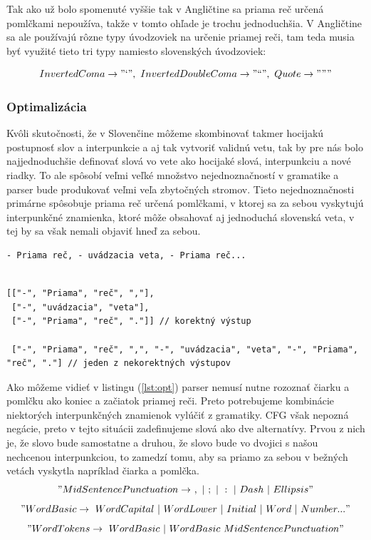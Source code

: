 \documentclass[12pt,a4paper]{report}
\theoremstyle{definition}
\theoremstyle{remark}
\begin{document}
Tak ako už bolo spomenuté vyššie tak v Angličtine sa priama reč určená pomlčkami nepoužíva, takže v tomto ohľade je trochu jednoduchšia. V Angličtine sa ale používajú rôzne typy úvodzoviek na určenie priamej reči, tam teda musia byť využité tieto tri typy namiesto slovenských úvodzoviek:

$$InvertedComa \to "\text{`}", \ InvertedDoubleComa \to"\text{``}", \  Quote \to """$$

\subsubsection{Optimalizácia}
Kvôli skutočnosti, že v Slovenčine môžeme skombinovať takmer hocijakú postupnosť slov a interpunkcie a aj tak vytvoriť validnú vetu, tak by pre nás bolo najjednoduchšie definovať slová vo vete ako hocijaké slová, interpunkciu a nové riadky. To ale spôsobí veľmi veľké množstvo nejednoznačností v gramatike a parser bude produkovať veľmi veľa zbytočných stromov. Tieto nejednoznačnosti primárne spôsobuje priama reč určená pomlčkami, v ktorej sa za sebou vyskytujú interpunkčné znamienka, ktoré môže obsahovať aj jednoduchá slovenská veta, v tej by sa však nemali objaviť hneď za sebou.
\begin{lstlisting}[caption={Nejednoznačný vstup},style=htmlcssjs]
- Priama reč, - uvádzacia veta, - Priama reč...
\end{lstlisting}
\begin{lstlisting}[caption={Výstupné vety vo forme polí},style=htmlcssjs, label={lst:opt}]

[["-", "Priama", "reč", ","],
 ["-", "uvádzacia", "veta"],
 ["-", "Priama", "reč", "."]] // korektný výstup
 
 ["-", "Priama", "reč", ",", "-", "uvádzacia", "veta", "-", "Priama", "reč", "."] // jeden z nekorektných výstupov
\end{lstlisting}
Ako môžeme vidieť v listingu (\ref{lst:opt}) parser nemusí nutne rozoznať čiarku a pomlčku ako koniec a začiatok priamej reči. Preto potrebujeme kombinácie niektorých interpunkčných znamienok vylúčiť z gramatiky. CFG však nepozná negácie, preto v tejto situácii zadefinujeme slová ako dve alternatívy. Prvou z nich je, že slovo bude samostatne a druhou, že slovo bude vo dvojici s našou nechcenou interpunkciou, to zamedzí tomu, aby sa priamo za sebou v bežných vetách vyskytla napríklad čiarka a pomlčka.
$$"MidSentencePunctuation \to \ , \ | \ ; \ | \ : \ | \ Dash \  | \ Ellipsis"$$
$$"WordBasic \to  \ WordCapital \ | \ WordLower \ | \ Initial \ | \ Word \ | \ Number ..."$$
$$"WordTokens  \to\  WordBasic \ | \ WordBasic \ MidSentencePunctuation"$$
\end{document}
